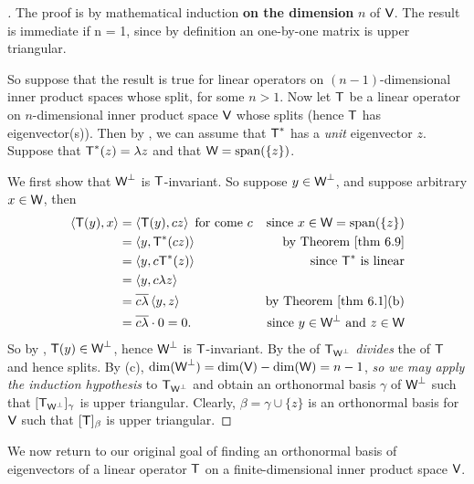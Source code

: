 \begin{proof} []
The proof is by mathematical induction \textbf{on the dimension} \(n\) of \(\textsf{V}\).
The result is immediate if n = 1, since by definition an one-by-one matrix is upper triangular.

So suppose that the result is true for linear operators on \((n - 1)\)-dimensional inner product spaces whose \CPOLY{} split, for some \(n > 1\).
Now let \(\textsf{T}\) be a linear operator on \(n\)-dimensional inner product space \(\textsf{V}\) whose \CPOLY{} splits (hence \(\textsf{T}\) has eigenvector(s)).
Then by , we can assume that \(\textsf{T}^*\) has a \emph{unit} eigenvector \(z\).
Suppose that \(\textsf{T}^*(z) = \lambda z\) and that \(\textsf{W} = \operatorname{span}(\{ z \})\).

We first show that \(\textsf{W}^{\perp}\) is \(\textsf{T}\)-invariant.
So suppose \(y \in \textsf{W}^{\perp}\), and suppose arbitrary \(x \in \textsf{W}\), then
\begin{align*}
    \LG \T(y), x \RG & = \LG \T(y), cz \RG \text{\ for come \(c\)} & \text{since \(x \in \W = \spann(\{z\})\)} \\
        & = \LG y, \T^*(cz) \RG & \text{by \THM{6.9}} \\
        & = \LG y, c\T^*(z) \RG & \text{since \(\T^*\) is linear} \\
        & = \LG y, c \lambda z \RG \\
        & = \conjugatet{c \lambda} \LG y, z \RG & \text{by \THM{6.1}(b)} \\
        & = \conjugatet{c \lambda} \cdot 0 = 0. & \text{since \(y \in \W^{\perp}\) and \(z \in \W\)}
\end{align*}
So by , \(\textsf{T}(y) \in \textsf{W}^{\perp}\), hence \(\textsf{W}^{\perp}\) is \(\textsf{T}\)-invariant.
By  the \CPOLY{} of \(\textsf{T}_{\textsf{W}^{\perp}}\)
\emph{divides} the \CPOLY{} of \(\textsf{T}\) and hence splits.
By (c), \(\dim(\textsf{W}^{\perp}) = \dim(\textsf{V}) - \dim(\textsf{W}) = n - 1\), \emph{so we may apply the induction hypothesis} to \(\textsf{T}_{\textsf{W}^{\perp}}\) and obtain an orthonormal basis \(\gamma\) of \(\textsf{W}^{\perp}\) such that \([\textsf{T}_{\textsf{W}^{\perp}}]_{\gamma}\) is upper triangular.
Clearly, \(\beta = \gamma \cup \{ z \}\) is an orthonormal basis for \(\textsf{V}\) such that \([\textsf{T}]_{\beta}\) is upper triangular.
\end{proof}

We now return to our original goal of finding an orthonormal basis of eigenvectors of a linear operator \(\textsf{T}\) on a finite-dimensional inner product space \(\textsf{V}\).


